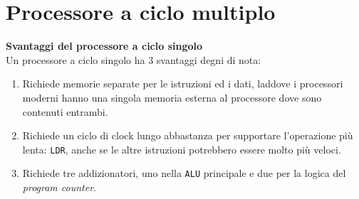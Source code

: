 





\section{Processore a ciclo multiplo}


\begin{note}
    \textbf{Svantaggi del processore a ciclo singolo} \\
    Un processore a ciclo singolo ha 3 svantaggi degni di nota:
    \begin{enumerate}
        \item Richiede memorie separate per le istruzioni ed i dati, laddove i
        processori moderni hanno una singola memoria esterna al processore dove
        sono contenuti entrambi.
        \item Richiede un ciclo di clock lungo abbastanza per supportare
        l'operazione più lenta: \texttt{LDR}, anche se le altre istruzioni
        potrebbero essere molto più veloci.
        \item Richiede tre addizionatori, uno nella \texttt{ALU} principale e
        due per la logica del \textit{program counter}.
    \end{enumerate}
\end{note}

